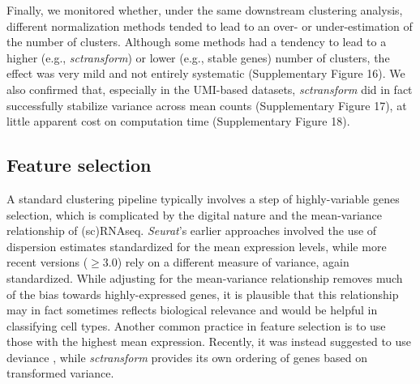 \documentclass{bmcart}
\begin{document}
Finally, we monitored whether, under the same downstream clustering analysis, different normalization methods tended to lead to an over- or under-estimation of the number of clusters. Although some methods had a tendency to lead to a higher (e.g., \textit{sctransform}) or lower (e.g., stable genes) number of clusters, the effect was very mild and not entirely systematic (Supplementary Figure 16). We also confirmed that, especially in the UMI-based datasets, \textit{sctransform} did in fact successfully stabilize variance across mean counts (Supplementary Figure 17), at little apparent cost on computation time (Supplementary Figure 18).

\subsection*{Feature selection}

A standard clustering pipeline typically involves a step of highly-variable genes selection, which is complicated by the digital nature and the mean-variance relationship of (sc)RNAseq. \textit{Seurat}'s earlier approaches involved the use of dispersion estimates standardized for the mean expression levels, while more recent versions ($\geq$3.0) rely on a different measure of variance, again standardized. While adjusting for the mean-variance relationship removes much of the bias towards highly-expressed genes, it is plausible that this relationship may in fact sometimes reflects biological relevance and would be helpful in classifying cell types. Another common practice in feature selection is to use those with the highest mean expression. Recently, it was instead suggested to use deviance \cite{townesGlmpca2019}, while \textit{sctransform} provides its own ordering of genes based on transformed variance.
\end{document}
